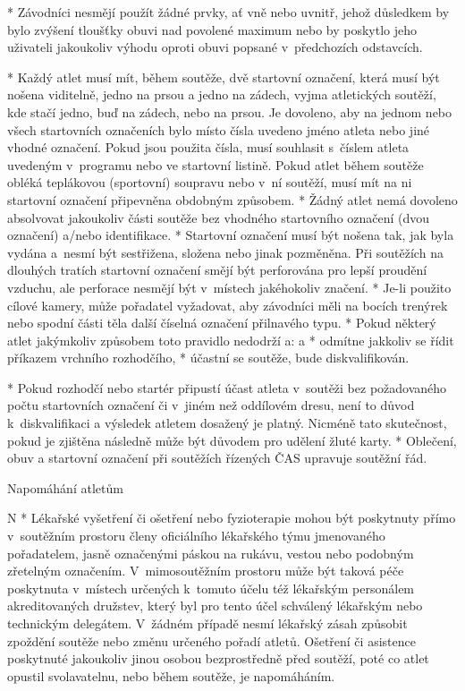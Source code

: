 * Závodníci nesmějí použít žádné prvky, ať vně nebo uvnitř, jehož důsledkem by bylo zvýšení tloušťky obuvi nad povolené maximum nebo by poskytlo jeho uživateli jakoukoliv výhodu oproti obuvi popsané v~předchozích odstavcích.

* Každý atlet musí mít, během soutěže, dvě startovní označení, která musí být nošena viditelně, jedno na prsou a jedno na zádech, vyjma atletických soutěží, kde stačí jedno, buď na zádech, nebo na prsou. Je dovoleno, aby na jednom nebo všech startovních označeních bylo místo čísla uvedeno jméno atleta nebo jiné vhodné označení. Pokud jsou použita čísla, musí souhlasit s~číslem atleta uvedeným v~programu nebo ve startovní listině. Pokud atlet během soutěže obléká  teplákovou (sportovní) soupravu nebo v~ní soutěží, musí mít na ni startovní označení připevněna obdobným způsobem.
* Žádný atlet nemá dovoleno absolvovat jakoukoliv části soutěže bez vhodného startovního označení (dvou označení) a/nebo identifikace.
* Startovní označení musí být nošena tak, jak byla vydána a~nesmí být sestřižena, složena nebo jinak pozměněna. Při soutěžích na dlouhých tratích startovní označení smějí být perforována pro lepší proudění vzduchu, ale perforace nesmějí být v~místech jakéhokoliv značení.
* Je-li použito cílové kamery, může pořadatel vyžadovat, aby závodníci měli na bocích trenýrek nebo spodní části těla další číselná označení přilnavého typu.
* Pokud některý atlet jakýmkoliv způsobem toto pravidlo nedodrží a:
  \begitems \style a
  * odmítne jakkoliv se řídit příkazem vrchního rozhodčího,
  * účastní se soutěže,
  \enditems
bude diskvalifikován.

* Pokud rozhodčí nebo startér připustí účast atleta v~soutěži bez požadovaného počtu startovních označení či v~jiném než oddílovém dresu, není to důvod k~diskvalifikaci a výsledek atletem dosažený je platný. Nicméně tato skutečnost, pokud je zjištěna následně může být důvodem pro udělení žluté karty.
* Oblečení, obuv a startovní označení při soutěžích řízených ČAS upravuje soutěžní řád.
\enditems

\secc Napomáhání atletům

\begitems \style N
* Lékařské vyšetření či ošetření nebo fyzioterapie mohou být poskytnuty přímo v~soutěžním prostoru členy oficiálního lékařského týmu jmenovaného pořadatelem, jasně označenými páskou na rukávu, vestou nebo podobným zřetelným označením. V~mimosoutěžním prostoru může být taková péče poskytnuta v~místech určených k~tomuto účelu též lékařským personálem akreditovaných družstev, který byl pro tento účel schválený lékařským nebo technickým delegátem. V~žádném případě nesmí lékařský zásah způsobit zpoždění soutěže nebo změnu určeného pořadí atletů. Ošetření či asistence poskytnuté jakoukoliv jinou osobou bezprostředně před soutěží, poté co atlet opustil svolavatelnu, nebo během soutěže, je napomáháním.

